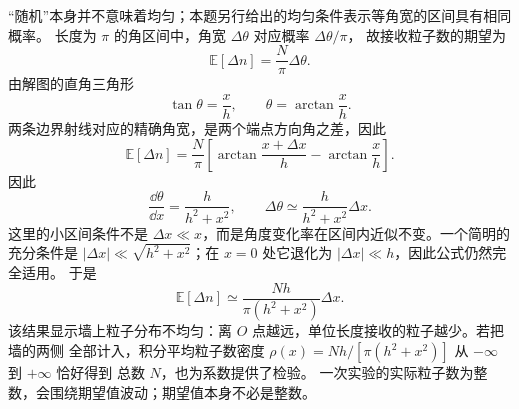 \begin{xesolution}
“随机”本身并不意味着均匀；本题另行给出的均匀条件表示等角宽的区间具有相同概率。
长度为 $\pi$ 的角区间中，角宽 $\Delta\theta$ 对应概率 $\Delta\theta/\pi$，
故接收粒子数的期望为
\[
 \mathbb E[\Delta n]=\frac{N}{\pi}\Delta\theta.
\]
由解图的直角三角形
\[
 \tan\theta=\frac{x}{h},\qquad
 \theta=\arctan\frac{x}{h}.
\]
两条边界射线对应的精确角宽，是两个端点方向角之差，因此
\[
 \mathbb E[\Delta n]=\frac N\pi
 \left[\arctan\frac{x+\Delta x}{h}-\arctan\frac{x}{h}\right].
\]
因此
\[
 \frac{\dd\theta}{\dd x}
 =\frac{h}{h^2+x^2},\qquad
 \Delta\theta\simeq\frac{h}{h^2+x^2}\Delta x.
\]
这里的小区间条件不是 $\Delta x\ll x$，而是角度变化率在区间内近似不变。一个简明的充分条件是
$|\Delta x|\ll\sqrt{h^2+x^2}$；在 $x=0$ 处它退化为 $|\Delta x|\ll h$，因此公式仍然完全适用。
于是
\[
 \boxed{\mathbb E[\Delta n]\simeq
 \frac{Nh}{\pi(h^2+x^2)}\Delta x}.
\]
\soldiagOneSixteen
该结果显示墙上粒子分布不均匀：离 $O$ 点越远，单位长度接收的粒子越少。若把墙的两侧
全部计入，积分平均粒子数密度 $\rho(x)=Nh/[\pi(h^2+x^2)]$ 从 $-\infty$ 到 $+\infty$ 恰好得到
总数 $N$，也为系数提供了检验。
一次实验的实际粒子数为整数，会围绕期望值波动；期望值本身不必是整数。
\end{xesolution}
